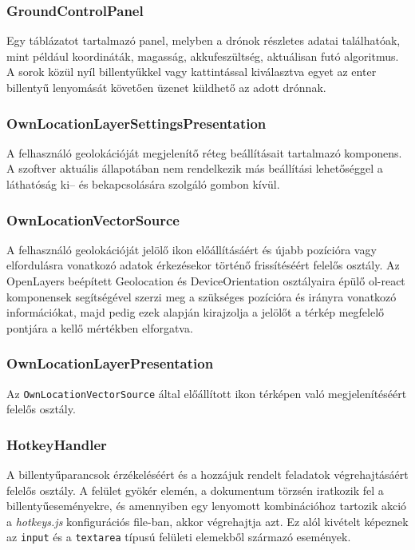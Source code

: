 \subsubsection{GroundControlPanel}

Egy táblázatot tartalmazó panel, melyben a drónok részletes adatai találhatóak,
mint például koordináták, magasság, akkufeszültség, aktuálisan futó algoritmus.
A sorok közül nyíl billentyűkkel vagy kattintással kiválasztva egyet az enter
billentyű lenyomását követően üzenet küldhető az adott drónnak.

\subsubsection{OwnLocationLayerSettingsPresentation}

A felhasználó geolokációját megjelenítő réteg beállításait tartalmazó komponens.
A szoftver aktuális állapotában nem rendelkezik más beállítási lehetőséggel a
láthatóság ki-- és bekapcsolására szolgáló gombon kívül.

\subsubsection{OwnLocationVectorSource}

A felhasználó geolokációját jelölő ikon előállításáért és újabb pozícióra vagy
elfordulásra vonatkozó adatok érkezésekor történő frissítéséért felelős osztály.
Az OpenLayers beépített Geolocation és DeviceOrientation osztályaira épülő
ol-react komponensek segítségével szerzi meg a szükséges pozícióra és irányra
vonatkozó információkat, majd pedig ezek alapján kirajzolja a jelölőt a térkép
megfelelő pontjára a kellő mértékben elforgatva.

\subsubsection{OwnLocationLayerPresentation}

Az \verb|OwnLocationVectorSource| által előállított ikon térképen való
megjelenítéséért felelős osztály.

\subsubsection{HotkeyHandler}

A billentyűparancsok érzékeléséért és a hozzájuk rendelt feladatok
végrehajtásáért felelős osztály. A felület gyökér elemén, a dokumentum törzsén
iratkozik fel a billentyűeseményekre, és amennyiben egy lenyomott kombinációhoz
tartozik akció a \textit{hotkeys.js} konfigurációs file-ban, akkor végrehajtja
azt. Ez alól kivételt képeznek az \verb|input| és a \verb|textarea| típusú
felületi elemekből származó események.

